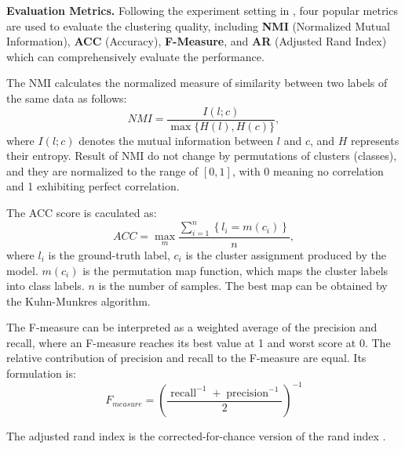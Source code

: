 \documentclass[journal]{IEEEtran}
\begin{document}
\textbf{Evaluation Metrics.}
Following the experiment setting in \cite{Zhao2017MultiViewCV,Zhang2017LatentMS},
four popular metrics are used to evaluate the clustering quality, including \textbf{NMI} (Normalized Mutual Information), \textbf{ACC} (Accuracy), \textbf{F-Measure}, and \textbf{AR} (Adjusted Rand Index) which can comprehensively evaluate the performance.

The NMI calculates the normalized measure of similarity between two labels of the same data as follows:
\begin{equation}
N M I=\frac{I(l ; c)}{\max \{H(l), H(c)\}},
\end{equation}
where $I(l ; c)$ denotes the mutual information between $l$ and $c$, and $H$ represents their entropy.
Result of NMI do not change by permutations of clusters (classes), and they are normalized to the range of $[0, 1]$, with 0 meaning no correlation and 1 exhibiting perfect correlation.

The ACC score is caculated as:
\begin{equation}
A C C=\max _{m} \frac{\sum_{i=1}^{n}\left\{l_{i}=m\left(c_{i}\right)\right\}}{n},
\end{equation}
where $l_i$ is the ground-truth label, $c_i$ is the cluster assignment produced by the model.
$m(c_{i})$ is the permutation map function, which maps the
cluster labels into class labels.
$n$ is the number of samples.
The best map can be obtained by the Kuhn-Munkres algorithm.


The F-measure can be interpreted as a weighted average of the precision and recall, where an F-measure reaches its best value at 1 and worst score at 0.
The relative contribution of precision and recall to the F-measure are equal. Its formulation is:
\begin{equation}
F_{measure}=\left(\frac{\operatorname{recall}^{-1}+\operatorname{precision}^{-1}}{2}\right)^{-1}
\end{equation}

The adjusted rand index is the corrected-for-chance version of the rand index \cite{rand1971objective}.
\end{document}
